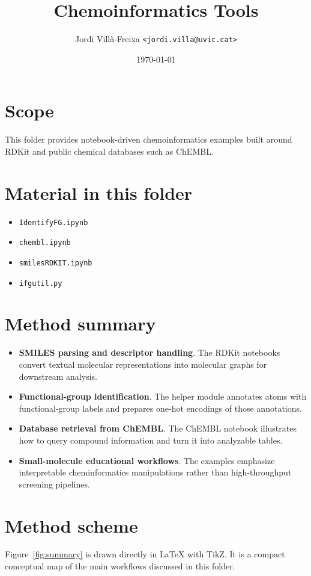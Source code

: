 \documentclass[11pt,a4paper]{article}
\title{Chemoinformatics Tools}
\author{Jordi Vill\`a-Freixa \texttt{<jordi.villa@uvic.cat>}}
\date{\today}
\begin{document}
    \maketitle

    \section*{Scope}
    This folder provides notebook-driven chemoinformatics examples built around RDKit and public chemical databases such as ChEMBL.

    \section*{Material in this folder}
    \begin{itemize}[leftmargin=*]
\item \texttt{IdentifyFG.ipynb}
\item \texttt{chembl.ipynb}
\item \texttt{smilesRDKIT.ipynb}
\item \texttt{ifgutil.py}
    \end{itemize}

    \section*{Method summary}
    \begin{itemize}[leftmargin=*]
\item \textbf{SMILES parsing and descriptor handling}. The RDKit notebooks convert textual molecular representations into molecular graphs for downstream analysis.
\item \textbf{Functional-group identification}. The helper module annotates atoms with functional-group labels and prepares one-hot encodings of those annotations.
\item \textbf{Database retrieval from ChEMBL}. The ChEMBL notebook illustrates how to query compound information and turn it into analyzable tables.
\item \textbf{Small-molecule educational workflows}. The examples emphasize interpretable cheminformatics manipulations rather than high-throughput screening pipelines.
    \end{itemize}

    \section*{Method scheme}
    Figure~\ref{fig:summary} is drawn directly in LaTeX with TikZ. It is a compact conceptual map of the main workflows discussed in this folder.
\end{document}
